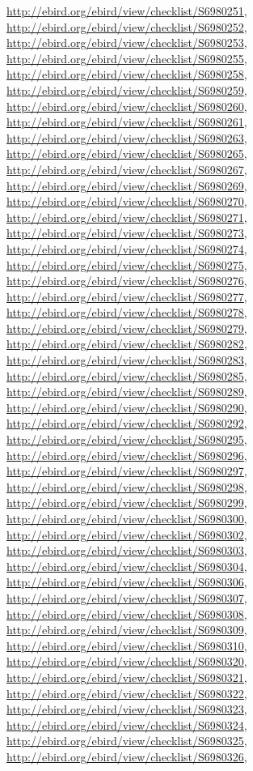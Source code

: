 \documentclass[9pt, article]{memoir}
\begin{document}
\begin{multicols}{2}
\url{http://ebird.org/ebird/view/checklist/S6980251}, 
\url{http://ebird.org/ebird/view/checklist/S6980252}, 
\url{http://ebird.org/ebird/view/checklist/S6980253}, 
\url{http://ebird.org/ebird/view/checklist/S6980255}, 
\url{http://ebird.org/ebird/view/checklist/S6980258}, 
\url{http://ebird.org/ebird/view/checklist/S6980259}, 
\url{http://ebird.org/ebird/view/checklist/S6980260}, 
\url{http://ebird.org/ebird/view/checklist/S6980261}, 
\url{http://ebird.org/ebird/view/checklist/S6980263}, 
\url{http://ebird.org/ebird/view/checklist/S6980265}, 
\url{http://ebird.org/ebird/view/checklist/S6980267}, 
\url{http://ebird.org/ebird/view/checklist/S6980269}, 
\url{http://ebird.org/ebird/view/checklist/S6980270}, 
\url{http://ebird.org/ebird/view/checklist/S6980271}, 
\url{http://ebird.org/ebird/view/checklist/S6980273}, 
\url{http://ebird.org/ebird/view/checklist/S6980274}, 
\url{http://ebird.org/ebird/view/checklist/S6980275}, 
\url{http://ebird.org/ebird/view/checklist/S6980276}, 
\url{http://ebird.org/ebird/view/checklist/S6980277}, 
\url{http://ebird.org/ebird/view/checklist/S6980278}, 
\url{http://ebird.org/ebird/view/checklist/S6980279}, 
\url{http://ebird.org/ebird/view/checklist/S6980282}, 
\url{http://ebird.org/ebird/view/checklist/S6980283}, 
\url{http://ebird.org/ebird/view/checklist/S6980285}, 
\url{http://ebird.org/ebird/view/checklist/S6980289}, 
\url{http://ebird.org/ebird/view/checklist/S6980290}, 
\url{http://ebird.org/ebird/view/checklist/S6980292}, 
\url{http://ebird.org/ebird/view/checklist/S6980295}, 
\url{http://ebird.org/ebird/view/checklist/S6980296}, 
\url{http://ebird.org/ebird/view/checklist/S6980297}, 
\url{http://ebird.org/ebird/view/checklist/S6980298}, 
\url{http://ebird.org/ebird/view/checklist/S6980299}, 
\url{http://ebird.org/ebird/view/checklist/S6980300}, 
\url{http://ebird.org/ebird/view/checklist/S6980302}, 
\url{http://ebird.org/ebird/view/checklist/S6980303}, 
\url{http://ebird.org/ebird/view/checklist/S6980304}, 
\url{http://ebird.org/ebird/view/checklist/S6980306}, 
\url{http://ebird.org/ebird/view/checklist/S6980307}, 
\url{http://ebird.org/ebird/view/checklist/S6980308}, 
\url{http://ebird.org/ebird/view/checklist/S6980309}, 
\url{http://ebird.org/ebird/view/checklist/S6980310}, 
\url{http://ebird.org/ebird/view/checklist/S6980320}, 
\url{http://ebird.org/ebird/view/checklist/S6980321}, 
\url{http://ebird.org/ebird/view/checklist/S6980322}, 
\url{http://ebird.org/ebird/view/checklist/S6980323}, 
\url{http://ebird.org/ebird/view/checklist/S6980324}, 
\url{http://ebird.org/ebird/view/checklist/S6980325}, 
\url{http://ebird.org/ebird/view/checklist/S6980326}, 

\end{multicols}
\end{document}
